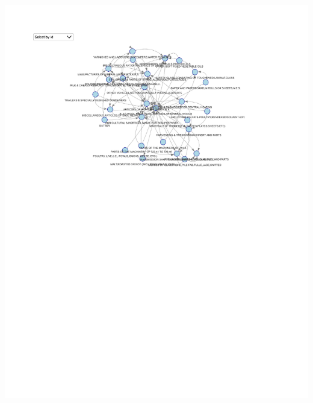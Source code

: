 \documentclass[
]{article}
\begin{document}
\includegraphics{export-network_files/figure-latex/unnamed-chunk-17-1.pdf}
\end{document}
